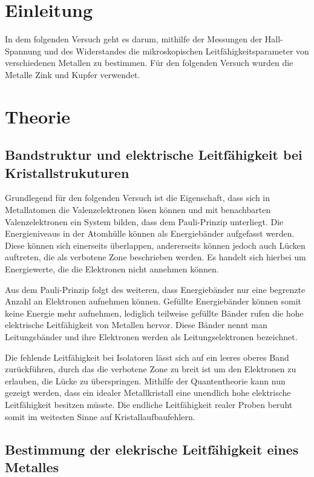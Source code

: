 \section{Einleitung}

In dem folgenden Versuch geht es darum, mithilfe der Messungen der Hall-Spannung
und des Widerstandes die mikroskopischen Leitfähigkeitsparameter von verschiedenen
Metallen zu bestimmen. Für den folgenden Versuch wurden die Metalle Zink und Kupfer
verwendet.

\section{Theorie}
\subsection{Bandstruktur und elektrische Leitfähigkeit bei Kristallstrukuturen}

Grundlegend für den folgenden Versuch ist die Eigenschaft, dass sich in Metallatomen
die Valenzelektronen lösen können und mit benachbarten Valenzelektronen ein
System bilden, dass dem Pauli-Prinzip unterliegt. Die Energieniveaus
in der Atomhülle können als Energiebänder aufgefasst werden. Diese können sich einerseits
überlappen, andererseits können jedoch auch Lücken auftreten, die als verbotene
Zone beschrieben werden. Es handelt sich hierbei um Energiewerte, die die Elektronen
nicht annehmen können.

Aus dem Pauli-Prinzip folgt des weiteren, dass Energiebänder nur eine begrenzte
Anzahl an Elektronen aufnehmen können. Gefüllte Energiebänder können somit keine
Energie mehr aufnehmen, lediglich teilweise gefüllte Bänder rufen die hohe elektrische
Leitfähigkeit von Metallen hervor. Diese Bänder nennt man Leitungsbänder und ihre
Elektronen werden als Leitungselektronen bezeichnet.

Die fehlende Leitfähigkeit bei Isolatoren lässt sich auf ein leeres oberes Band
zurückführen, durch das die verbotene Zone zu breit ist um den Elektronen zu
erlauben, die Lücke zu überspringen. Mithilfe der Quantentheorie kann nun gezeigt
werden, dass ein idealer Metallkristall eine unendlich hohe elektrische Leitfähigkeit
besitzen müsste. Die endliche Leitfähigkeit realer Proben beruht somit im weitesten
Sinne auf Kristallaufbaufehlern.

\subsection{Bestimmung der elekrische Leitfähigkeit eines Metalles}


